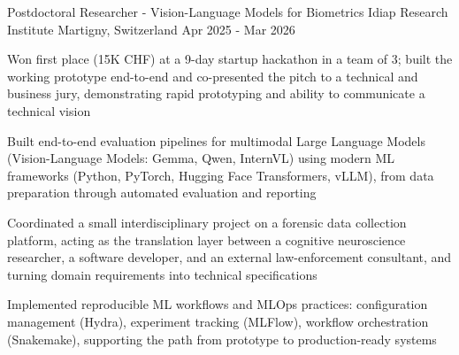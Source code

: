 

\begin{cventries}

\cventry
    {Postdoctoral Researcher - Vision-Language Models for Biometrics} %
    {Idiap Research Institute} %
    {Martigny, Switzerland} %
    {Apr 2025 - Mar 2026} %
    {
      \begin{cvitems} %
        \item {Won first place (15K CHF) at a 9-day startup hackathon in a team of 3; built the working prototype end-to-end and co-presented the pitch to a technical and business jury, demonstrating rapid prototyping and ability to communicate a technical vision}
        \item {Built end-to-end evaluation pipelines for multimodal Large Language Models (Vision-Language Models: Gemma, Qwen, InternVL) using modern ML frameworks (Python, PyTorch, Hugging Face Transformers, vLLM), from data preparation through automated evaluation and reporting}
        \item {Coordinated a small interdisciplinary project on a forensic data collection platform, acting as the translation layer between a cognitive neuroscience researcher, a software developer, and an external law-enforcement consultant, and turning domain requirements into technical specifications}
        \item {Implemented reproducible ML workflows and MLOps practices: configuration management (Hydra), experiment tracking (MLFlow), workflow orchestration (Snakemake), supporting the path from prototype to production-ready systems}
      \end{cvitems}
    }


\end{cventries}
